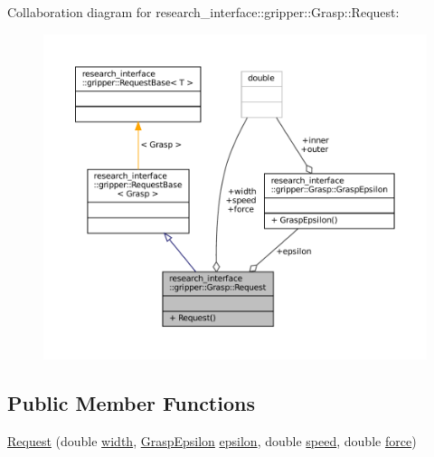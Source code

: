 Collaboration diagram for research\+\_\+interface\+:\+:gripper\+:\+:Grasp\+:\+:Request\+:
\nopagebreak
\begin{figure}[H]
\begin{center}
\leavevmode
\includegraphics[width=350pt]{structresearch__interface_1_1gripper_1_1Grasp_1_1Request__coll__graph}
\end{center}
\end{figure}
\subsection*{Public Member Functions}
\begin{DoxyCompactItemize}
\item 
\hyperlink{structresearch__interface_1_1gripper_1_1Grasp_1_1Request_ad8d8a3ab0df9b6f2f915ad93994911f3}{Request} (double \hyperlink{structresearch__interface_1_1gripper_1_1Grasp_1_1Request_adfb3ab33666b84558acf209f5c3ee5b5}{width}, \hyperlink{structresearch__interface_1_1gripper_1_1Grasp_1_1GraspEpsilon}{Grasp\+Epsilon} \hyperlink{structresearch__interface_1_1gripper_1_1Grasp_1_1Request_a9a91583c7bc9901245b953351f5e7a82}{epsilon}, double \hyperlink{structresearch__interface_1_1gripper_1_1Grasp_1_1Request_aa884e08fa60588e53d8d38e3c997e12c}{speed}, double \hyperlink{structresearch__interface_1_1gripper_1_1Grasp_1_1Request_a84995a737e54752b029845255155eee1}{force})
\end{DoxyCompactItemize}
